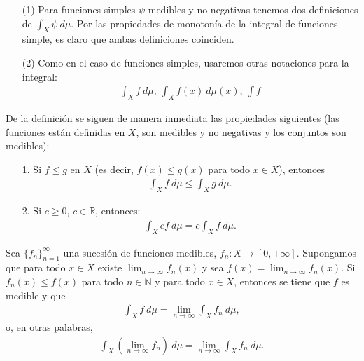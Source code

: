 \begin{obs}
    \begin{enumerate}
        \item[(1)] Para funciones simples $\psi$ medibles y no negativas tenemos dos definiciones de $\int_{X}{\psi \ d\mu}$. Por las propiedades de monotonía de la integral de funciones simple, es claro que ambas definiciones coinciden.
        \item[(2)] Como en el caso de funciones simples, usaremos otras notaciones para la integral:
              \begin{align*}
                  \int_{X}{f \ d\mu}, \ \int_{X}{f(x) \ d\mu(x)}, \ \int{f}
              \end{align*}
    \end{enumerate}
\end{obs}

De la definición se siguen de manera inmediata las propiedades siguientes (las funciones están definidas en $X$, son medibles y no negativas y los conjuntos son medibles):
\begin{enumerate}
    \item[1.] Si $f \leq g$ en $X$ (es decir, $f(x) \leq g(x)$ para todo $x \in X$), entonces
          \begin{align*}
              \int_{X}{f \ d\mu} \leq \int_{X}{g \ d\mu}.
          \end{align*}
    \item[2.] Si $c \ge 0$, $c \in \mathbb{R}$, entonces:
          \begin{align*}
              \int_{X}{cf \ d\mu} = c\int_{X}{f \ d\mu}.
          \end{align*}
\end{enumerate}

\begin{teo}
    Sea  $\{ f_n \}_{n=1}^{\infty}$ una sucesión de funciones medibles, $f_n: X \longrightarrow [0,+\infty]$. Supongamos que para todo $x \in X$ existe $\lim_{n \to \infty}{f_n(x)}$ y sea $f(x) = \lim_{n \to \infty}{f_n(x)}$. Si $f_n(x) \leq f(x)$ para todo $n \in \mathbb{N}$ y para todo $x \in X$, entonces se tiene que $f$ es medible y que
    \begin{align*}
        \int_{X}{f \ d\mu} = \lim_{n \to \infty}{\int_{X}{f_n \ d\mu}},
    \end{align*}
    o, en otras palabras,
    \begin{align*}
        \int_{X}{\left( \lim_{n \to \infty}{f_n}\right) \ d\mu} = \lim_{n \to \infty}{\int_{X}{f_n \ d\mu}}.
    \end{align*}
\end{teo}

